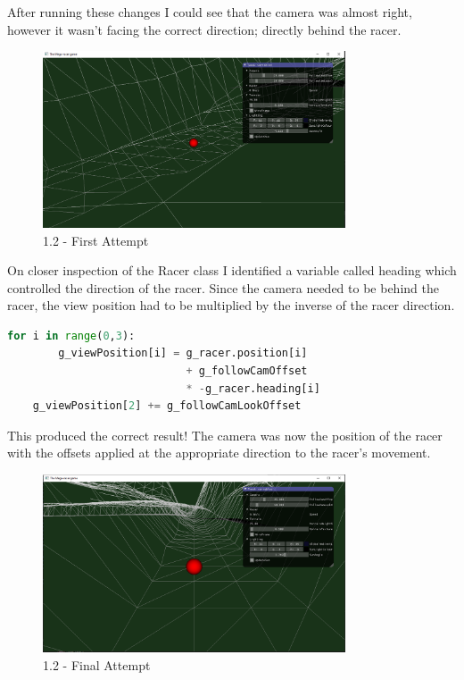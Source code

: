 \documentclass[a4 paper, 12pt]{article}
\begin{document}
After running these changes I could see that the camera was almost right, however it wasn't facing the correct direction; directly behind the racer. 
    \begin{figure} [H]
        \centering
        \includegraphics[width=0.8\textwidth, frame]
            {./images/1.2_a.PNG}
        \caption{1.2 - First Attempt}
    \end{figure}

On closer inspection of the Racer class I identified a variable called heading which controlled the direction of the racer. Since the camera needed to be behind the racer, the view position had to be multiplied by the inverse of the racer direction.
    \begin{lstlisting}[language=python]
    for i in range(0,3):
        g_viewPosition[i] = g_racer.position[i] 
                            + g_followCamOffset 
                            * -g_racer.heading[i]
    g_viewPosition[2] += g_followCamLookOffset
    \end{lstlisting}

This produced the correct result! The camera was now the position of the racer with the offsets applied at the appropriate direction to the racer's movement.
    \begin{figure} [H]
        \centering
        \includegraphics[width=0.8\textwidth, frame]
            {./images/1.2_b.PNG}
        \caption{1.2 - Final Attempt}
    \end{figure}  
\end{document}
